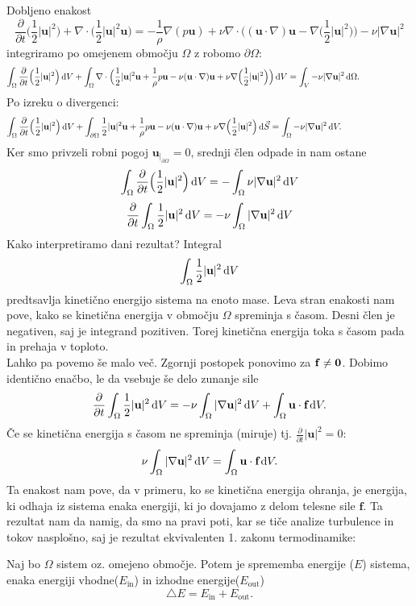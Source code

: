 \documentclass[mat2, tisk]{fmfdelo}
\newcommand{\bd}{\textbf}
\begin{document}
Dobljeno enakost 
$$
\frac{\partial}{\partial t} \Big(\frac{1}{2} |\bd{u}|^2 \Big) + \nabla \cdot \Big(\frac{1}{2} |\bd{u}|^2 \bd{u}\Big) = 
-\frac{1}{\rho}\nabla(p \bd{u}) + \nu \nabla\cdot\Big((\bd{u}\cdot \nabla)\bd{u} - \nabla\Big(\frac{1}{2} |\bd{u}|^2\Big)\Big) - \nu|\nabla \bd{u}|^2
$$
integriramo po omejenem območju $\Omega$ z robomo $\partial \Omega$:
\begin{align*}
\int_\Omega \frac{\partial}{\partial t} \Big(\frac{1}{2} |\bd{u}|^2 \Big)\dif V + \int_\Omega \nabla \cdot\Big(\frac{1}{2} |\bd{u}|^2 \bd{u}+\frac{1}{\rho}p \bd{u} - \nu(\bd{u}\cdot \nabla)\bd{u} + \nu\nabla\Big(\frac{1}{2} |\bd{u}|^2\Big)\Big)\dif V =\int_V - \nu|\nabla \bd{u}|^2 \dif \Omega.\qquad\qquad\qquad
\end{align*}
Po izreku o divergenci:
\begin{align*}
  \int_\Omega \frac{\partial}{\partial t} \Big(\frac{1}{2} |\bd{u}|^2 \Big)\dif V + \int_{\partial\Omega} \frac{1}{2} |\bd{u}|^2 \bd{u}
  +\frac{1}{\rho}p \bd{u} - \nu(\bd{u}\cdot \nabla)\bd{u} + \nu\nabla\Big(\frac{1}{2} |\bd{u}|^2\Big)\dif \vec{S} =\int_\Omega - \nu|\nabla \bd{u}|^2 \dif V.\qquad\qquad\qquad\qquad
\end{align*}
Ker smo privzeli robni pogoj $\bd{u}_{|_{\partial\Omega}} = 0$, srednji člen odpade in nam ostane 
$$
\int_\Omega \frac{\partial}{\partial t} \Big(\frac{1}{2} |\bd{u}|^2 \Big)\dif V = - \int_\Omega\nu|\nabla \bd{u}|^2 \dif V
$$
$$
\frac{\partial}{\partial t}\int_\Omega \frac{1}{2} |\bd{u}|^2 \dif V = - \nu\int_\Omega |\nabla \bd{u}|^2 \dif V
$$
Kako interpretiramo dani rezultat? Integral 
$$
\int_\Omega \frac{1}{2} |\bd{u}|^2 \dif V
$$
predtsavlja kinetično energijo sistema na enoto mase.
Leva stran enakosti nam pove, kako se kinetična energija 
v območju $\Omega$ spreminja s časom. Desni člen je negativen, saj je integrand pozitiven.
Torej kinetična energija toka s časom pada in prehaja v toploto.\\
Lahko pa povemo še malo več. Zgornji postopek ponovimo za $\bf{f} \neq 0$. Dobimo identično enačbo, le da vsebuje še delo zunanje sile
\begin{equation}
\frac{\partial}{\partial t}\int_\Omega \frac{1}{2} |\bd{u}|^2 \dif V = - \nu\int_\Omega |\nabla \bd{u}|^2 \dif V + \int_\Omega \bd{u}\cdot \bd{f} \dif V.
\end{equation}
Če se kinetična energija s časom ne spreminja (miruje) tj. $\frac{\partial}{\partial t} |\bd{u}|^2 = 0$:
$$
 \nu\int_\Omega |\nabla \bd{u}|^2 \dif V = \int_\Omega \bd{u}\cdot \bd{f} \dif V.
$$
Ta enakost nam pove, da v primeru, ko se kinetična energija ohranja, je energija, ki odhaja iz sistema enaka energiji, ki jo dovajamo z delom telesne sile $\bd{f}$.
Ta rezultat nam da namig, da smo na pravi poti, kar se tiče analize turbulence in tokov
nasplošno, saj je rezultat ekvivalenten 1. zakonu termodinamike:
\begin{definicija}
Naj bo $\Omega$ sistem oz. omejeno območje. Potem je sprememba energije ($E$) sistema, 
enaka energiji vhodne($E_\text{in}$) in izhodne energije($E_{\text{out}}$)
\begin{equation}
\triangle E = E_\text{in} + E_{\text{out}}.
\end{equation}
\end{definicija}
\end{document}
